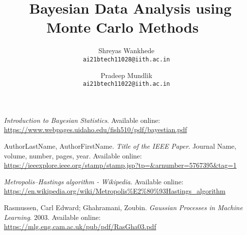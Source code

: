 \documentclass[10pt,twocolumn,letterpaper]{article}
\title{\ Bayesian Data Analysis using Monte Carlo Methods\ }
\author{Shreyas Wankhede\\
{\tt\small ai21btech11028@iith.ac.in}
\and
Pradeep Mundlik\\
{\tt\small ai21btech11022@iith.ac.in}
}
\begin{document}
\maketitle
   
 




{
    \small
    \nocite{*}
    
}

% 

\begin{thebibliography}{9}

    \textit{Introduction to Bayesian Statistics}.
    Available online: \url{https://www.webpages.uidaho.edu/fish510/pdf/bayestian.pdf} 
    
    AuthorLastName, AuthorFirstName. 
    \textit{Title of the IEEE Paper}.
    Journal Name, volume, number, pages, year.
    Available online: \url{https://ieeexplore.ieee.org/stamp/stamp.jsp?tp=&arnumber=5767395&tag=1}
    
    \textit{Metropolis–Hastings algorithm - Wikipedia}.
    Available online: \url{https://en.wikipedia.org/wiki/Metropolis\%E2\%80\%93Hastings_algorithm}
    
    Rasmussen, Carl Edward; Ghahramani, Zoubin.
    \textit{Gaussian Processes in Machine Learning}.
    2003.
    Available online: \url{https://mlg.eng.cam.ac.uk/pub/pdf/RasGha03.pdf}
    
    \end{thebibliography}
    
    
\end{document}
